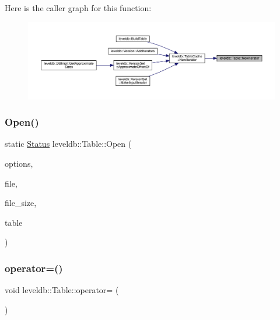 Here is the caller graph for this function\+:
\nopagebreak
\begin{figure}[H]
\begin{center}
\leavevmode
\includegraphics[width=350pt]{classleveldb_1_1_table_a022289eb109fe9b143052b5ed852096d_icgraph}
\end{center}
\end{figure}
\mbox{\label{classleveldb_1_1_table_af9f2fb3a90cf32b5e39da910c5c37afb}} 
\subsubsection{\texorpdfstring{Open()}{Open()}}
{\footnotesize\ttfamily static \mbox{\hyperlink{classleveldb_1_1_status}{Status}} leveldb\+::\+Table\+::\+Open (\begin{DoxyParamCaption}\item[{const \mbox{\hyperlink{structleveldb_1_1_options}{Options}} \&}]{options,  }\item[{\mbox{\hyperlink{classleveldb_1_1_random_access_file}{Random\+Access\+File}} $\ast$}]{file,  }\item[{uint64\+\_\+t}]{file\+\_\+size,  }\item[{\mbox{\hyperlink{classleveldb_1_1_table}{Table}} $\ast$$\ast$}]{table }\end{DoxyParamCaption})\hspace{0.3cm}{\ttfamily [static]}}

\mbox{\label{classleveldb_1_1_table_a75d9085263d90ecbebb0416118fbc977}} 
\subsubsection{\texorpdfstring{operator=()}{operator=()}}
{\footnotesize\ttfamily void leveldb\+::\+Table\+::operator= (\begin{DoxyParamCaption}\item[{const \mbox{\hyperlink{classleveldb_1_1_table}{Table}} \&}]{ }\end{DoxyParamCaption})\hspace{0.3cm}{\ttfamily [delete]}}



